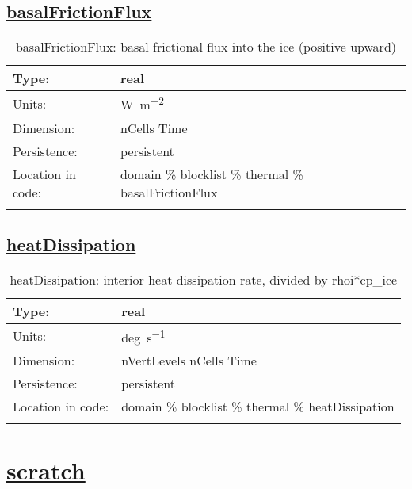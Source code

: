 \subsection[basalFrictionFlux]{\hyperref[sec:var_tab_thermal]{basalFrictionFlux}}
\label{subsec:var_sec_thermal_basalFrictionFlux}
\begin{center}
\begin{longtable}{| p{2.0in} | p{4.0in} |}
        \hline 
        Type: & real \\
        \hline 
        Units: & \si{W.m^{-2}} \\
        \hline 
        Dimension: & nCells Time \\
        \hline 
        Persistence: & persistent \\
        \hline 
         Location in code: & domain \% blocklist \% thermal \% basalFrictionFlux \\
         \hline 
    \caption{basalFrictionFlux: basal frictional flux into the ice (positive upward)}
\end{longtable}
\end{center}
\subsection[heatDissipation]{\hyperref[sec:var_tab_thermal]{heatDissipation}}
\label{subsec:var_sec_thermal_heatDissipation}
\begin{center}
\begin{longtable}{| p{2.0in} | p{4.0in} |}
        \hline 
        Type: & real \\
        \hline 
        Units: & \si{deg.s^{-1}} \\
        \hline 
        Dimension: & nVertLevels nCells Time \\
        \hline 
        Persistence: & persistent \\
        \hline 
         Location in code: & domain \% blocklist \% thermal \% heatDissipation \\
         \hline 
    \caption{heatDissipation: interior heat dissipation rate, divided by rhoi*cp\_ice}
\end{longtable}
\end{center}
\section[scratch]{\hyperref[sec:var_tab_scratch]{scratch}}
\label{sec:var_sec_scratch}
